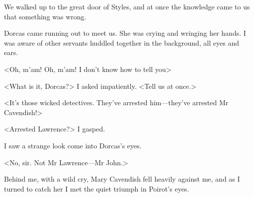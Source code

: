  We walked up to the great door of Styles, and at once the knowledge came to us that something was wrong. 

 Dorcas came running out to meet us. She was crying and wringing her hands. I was aware of other servants huddled together in the background, all eyes and ears. 

 <Oh, m'am! Oh, m'am! I don't know how to tell you\longdash> 

 <What is it, Dorcas?> I asked impatiently. <Tell us at once.> 

 <It's those wicked detectives. They've arrested him—they've arrested Mr Cavendish!> 

 <Arrested Lawrence?> I gasped. 

 I saw a strange look come into Dorcas's eyes. 

 <No, sir. Not Mr Lawrence—Mr John.> 

 Behind me, with a wild cry, Mary Cavendish fell heavily against me, and as I turned to catch her I met the quiet triumph in Poirot's eyes. 